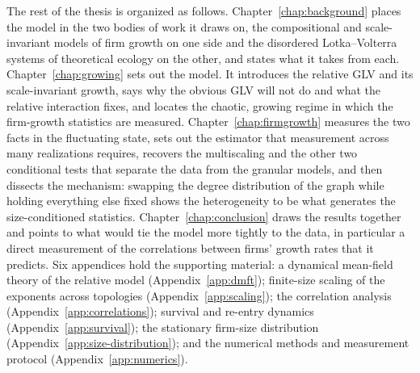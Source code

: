 The rest of the thesis is organized as follows. Chapter~\ref{chap:background} places the
model in the two bodies of work it draws on, the compositional and scale-invariant models
of firm growth on one side and the disordered Lotka--Volterra systems of theoretical
ecology on the other, and states what it takes from each.
Chapter~\ref{chap:growing} sets out the model.
It introduces the relative GLV and its scale-invariant growth, says why the obvious GLV will
not do and what the relative interaction fixes, and locates the chaotic, growing regime in
which the firm-growth statistics are measured. Chapter~\ref{chap:firmgrowth} measures the two
facts in the fluctuating state, sets out the estimator that measurement across many
realizations requires, recovers the multiscaling and the other two conditional tests that
separate the data from the granular models, and then dissects the mechanism: swapping the
degree distribution of the graph while holding everything else fixed shows the heterogeneity
to be what generates the size-conditioned statistics. Chapter~\ref{chap:conclusion} draws
the results together and points to what would tie the model more tightly to the data, in
particular a direct measurement of the correlations between firms' growth rates that it
predicts. Six appendices hold the supporting material: a dynamical mean-field theory of the
relative model (Appendix~\ref{app:dmft}); finite-size scaling of the exponents across topologies
(Appendix~\ref{app:scaling}); the correlation analysis (Appendix~\ref{app:correlations}); survival
and re-entry dynamics (Appendix~\ref{app:survival}); the stationary firm-size distribution
(Appendix~\ref{app:size-distribution}); and the numerical methods and measurement protocol
(Appendix~\ref{app:numerics}).
